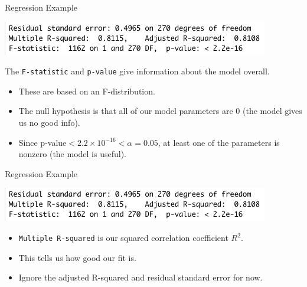 \begin{frame}{Regression Example}
    \begin{center}
        \includegraphics[scale=0.6]{images/regfstat.png}
    \end{center}
    The \texttt{F-statistic} and \texttt{p-value} give information about the model overall. 
    \begin{itemize}
        \item These are based on an F-distribution.
        \item The null hypothesis is that all of our model parameters are 0 (the model gives us no good info).
        \item Since p-value$ < 2.2\times10^{-16} < \alpha = 0.05$, at least one of the parameters is nonzero (the model is useful).
    \end{itemize}
\end{frame}

\begin{frame}{Regression Example}
    \begin{center}
        \includegraphics[scale=0.6]{images/regfstat.png}
    \end{center}
    \begin{itemize}
        \item \texttt{Multiple R-squared} is our squared correlation coefficient $R^2$. 
        \item This tells us how good our fit is.
        \item Ignore the adjusted R-squared and residual standard error for now.
    \end{itemize}
\end{frame}

